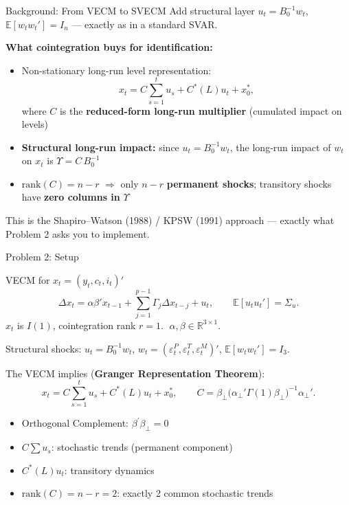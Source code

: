 \documentclass[aspectratio=169,11pt]{beamer}
\newcommand{\E}{\mathbb{E}}
\newcommand{\R}{\mathbb{R}}
\newcommand{\rank}{\mathrm{rank}}
\begin{document}
\begin{frame}{Background: From VECM to SVECM}
    Add structural layer $u_t = B_0^{-1}w_t$, $\E[w_tw_t']=I_n$ --- exactly as in a standard SVAR.

    \vspace{0.4em}
    \textbf{What cointegration buys for identification:}
    \begin{itemize}
        \item Non-stationary long-run level representation:
        \begin{equation*}
        x_t = C\sum_{s=1}^t u_s + C^*(L)u_t + x_0^*,
        \end{equation*}
        where $C$ is the \textbf{reduced-form long-run multiplier} (cumulated impact on levels)
        \item \textbf{Structural long-run impact:} since $u_t=B_0^{-1}w_t$, the long-run impact of $w_t$ on $x_t$ is $\Upsilon = C\,B_0^{-1}$
        \item $\rank(C)=n-r$ $\Rightarrow$ only $n-r$ \textbf{permanent shocks}; transitory shocks have \textbf{zero columns in} $\Upsilon$
    \end{itemize}

    \vspace{0.3em}
    \textcolor{mitred}{This is the Shapiro--Watson (1988) / KPSW (1991) approach --- exactly what Problem 2 asks you to implement.}
\end{frame}

\begin{frame}{Problem 2: Setup}
    \vspace{-1em}
    \begin{block}{VECM for $x_t = (y_t, c_t, i_t)'$}
        \vspace{-0.5em}
        \[
        \Delta x_t = \alpha\beta' x_{t-1} + \sum_{j=1}^{p-1}\Gamma_j \Delta x_{t-j} + u_t, \qquad \E[u_t u_t'] = \Sigma_u.
        \]
        $x_t$ is $I(1)$, cointegration rank $r = 1$. $\;\alpha,\beta \in \R^{3\times 1}$.

        Structural shocks: $u_t = B_0^{-1}w_t$, $w_t = (\varepsilon_t^P, \varepsilon_t^T, \varepsilon_t^M)'$, $\E[w_tw_t'] = I_3$.
    \end{block}
    \vspace{-0.5em}
    The VECM implies (\textbf{Granger Representation Theorem}):
    \[
    x_t = C\sum_{s=1}^t u_s + C^*(L)u_t + x_0^*, \qquad C = \beta_\perp\bigl(\alpha_\perp'\Gamma(1)\beta_\perp\bigr)^{-1}\alpha_\perp'.
    \]
    \begin{itemize}
        \item Orthogonal Complement: $\beta^\prime \beta_\perp = 0$
        \item $C\sum u_s$: stochastic trends (permanent component)
        \item $C^*(L)u_t$: transitory dynamics
        \item $\rank(C) = n - r = 2$: exactly 2 common stochastic trends
    \end{itemize}
\end{frame}
\end{document}
